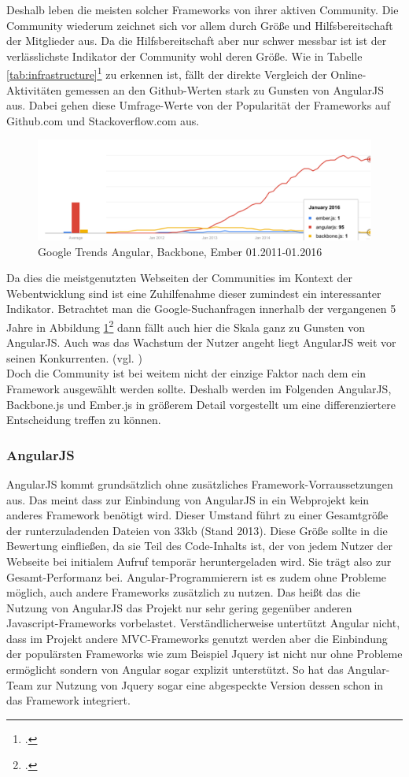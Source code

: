\documentclass[12pt,a4paper,oneside, 
liststotoc, 					%
bibtotoc,						%
titlepage, 						%
headsepline, 					%
BCOR6mm,						%
openany,							%
]{scrreprt}
\begin{document}
Deshalb leben die meisten solcher Frameworks von ihrer aktiven Community. Die Community wiederum zeichnet sich vor allem durch Größe und Hilfsbereitschaft der Mitglieder aus. Da die Hilfsbereitschaft aber nur schwer messbar ist ist der verlässlichste Indikator der Community wohl deren Größe.
Wie in Tabelle \ref{tab:infrastructure}\footcite{infrastructure_comparison} zu erkennen ist, fällt der direkte Vergleich der Online-Aktivitäten gemessen an den Github-Werten stark zu Gunsten von AngularJS aus. Dabei gehen diese Umfrage-Werte von der Popularität der Frameworks auf Github.com und Stackoverflow.com aus. 
\begin{figure}
	\centering
	\includegraphics[width=150mm]{Quellen/Google_Trends_angular_und_co.png}
	\caption{Google Trends Angular, Backbone, Ember 01.2011-01.2016}
	\label{img:google_trends_angular}
\end{figure}
Da dies die meistgenutzten Webseiten der Communities im Kontext der Webentwicklung sind ist eine Zuhilfenahme dieser zumindest ein interessanter Indikator. Betrachtet man die Google-Suchanfragen innerhalb der vergangenen 5 Jahre in Abbildung \ref{img:google_trends_angular}\footcite{analytics_angular} dann fällt auch hier die Skala ganz zu Gunsten von AngularJS. Auch was das Wachstum der Nutzer angeht liegt AngularJS weit vor seinen Konkurrenten. (vgl. \cite{funnyant_mvc_comparison})
\\Doch die Community ist bei weitem nicht der einzige Faktor nach dem ein Framework ausgewählt werden sollte. Deshalb werden im Folgenden AngularJS, Backbone.js und Ember.js in größerem Detail vorgestellt um eine differenziertere Entscheidung treffen zu können.
   \subsubsection{AngularJS}
AngularJS kommt grundsätzlich ohne zusätzliches Framework-Vorraussetzungen aus. Das meint dass zur Einbindung von AngularJS in ein Webprojekt kein anderes Framework benötigt wird. Dieser Umstand führt zu einer Gesamtgröße der runterzuladenden Dateien von 33kb (Stand 2013). Diese Größe sollte in die Bewertung einfließen, da sie Teil des Code-Inhalts ist, der von jedem Nutzer der Webseite bei initialem Aufruf temporär heruntergeladen wird. Sie trägt also zur Gesamt-Performanz bei. Angular-Programmierern ist es zudem ohne Probleme möglich, auch andere Frameworks zusätzlich zu nutzen. Das heißt das die Nutzung von AngularJS das Projekt nur sehr gering gegenüber anderen Javascript-Frameworks vorbelastet. Verständlicherweise untertützt Angular nicht, dass im Projekt andere MVC-Frameworks genutzt werden aber die Einbindung der populärsten Frameworks wie zum Beispiel Jquery ist nicht nur ohne Probleme ermöglicht sondern von Angular sogar explizit unterstützt. So hat das Angular-Team zur Nutzung von Jquery sogar eine abgespeckte Version dessen schon in das Framework integriert. 
\end{document}
